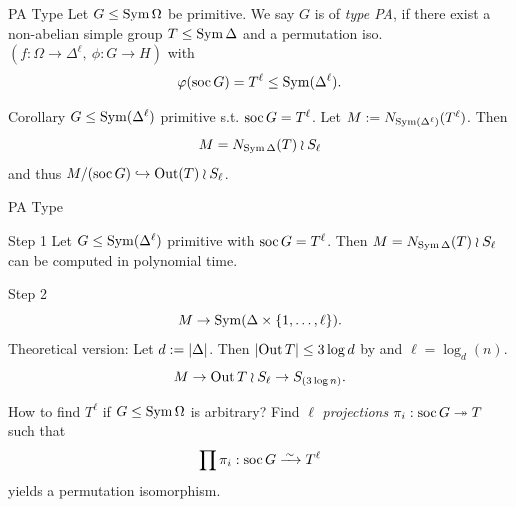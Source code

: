 \documentclass{beamer}
\theoremstyle{plain}
\theoremstyle{definition}
\begin{document}
%

\begin{frame}{PA Type}
Let $G \leq \operatorname{Sym} \Omega$ be primitive.
We say $G$ is of \emph{type PA}, if
there exist a non-abelian simple group
$T \leq \operatorname{Sym} \Delta$
and a permutation iso.
$(f : \Omega \to \Delta ^ \ell,~ \phi : G \to H)$
with
\[
\varphi (\operatorname{soc} G) = T ^ \ell \leq \operatorname{Sym}(\Delta ^ \ell).
\]

\pause
\begin{block}{Corollary}
$G \leq \operatorname{Sym}(\Delta ^ \ell)$ primitive s.t.
$\operatorname{soc} G = T ^ \ell$.
Let $M := N_{\operatorname{Sym} (\Delta ^ \ell)}(T ^ \ell)$.
Then
\[
    M = N_{\operatorname{Sym} \Delta}(T) \wr S_\ell
\]
and thus $M / (\operatorname{soc} G) \hookrightarrow \operatorname{Out}(T) \wr S_\ell$.
\end{block}
\end{frame}

\begin{frame}{PA Type}
\begin{block}{Step 1}
Let $G \leq \operatorname{Sym}(\Delta ^ \ell)$ primitive with
$\operatorname{soc} G = T ^ \ell$.
Then $M = N_{\operatorname{Sym} \Delta}(T) \wr S_\ell$ can be computed in polynomial
time.
\end{block}
\vspace{1em}

\pause
\begin{block}{Step 2}
\vspace{-1em}
\[
    M \rightarrow \operatorname{Sym}( \Delta \times  \left\{ 1, \ldots, \ell \right\}  ).
\]
\pause
Theoretical version: Let $d :=  \left| \Delta \right| $.
Then $ \left| \operatorname{Out} T \right|  \leq 3 \log d$ by
\cite{guralnick-maroti-pyber:normalizers-primitive-groups}
and $\ell = \log_d(n)$.
\[
    M \rightarrow \operatorname{Out} T \wr S_\ell \rightarrow S_{(3 \log n)}.
\]
\end{block}
\end{frame}

\begin{frame}
How to find $T ^ \ell$ if $G \leq \operatorname{Sym} \Omega$ is arbitrary?
Find $\ell$ \emph{projections} $\pi_i : \operatorname{soc} G \twoheadrightarrow T$
such that
\[
\prod \pi_i : \soc G \iso T ^ \ell
\]
yields a permutation isomorphism.
\end{frame}
\end{document}
